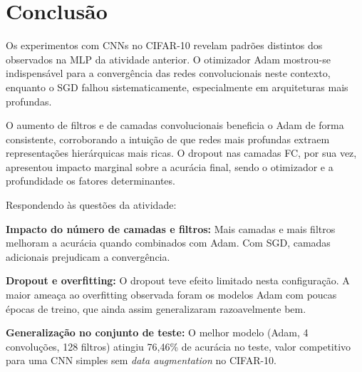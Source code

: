 \documentclass[12pt,a4paper]{article}
\begin{document}
\section{Conclusão}

Os experimentos com CNNs no CIFAR-10 revelam padrões distintos dos observados na MLP da atividade anterior. O otimizador Adam mostrou-se indispensável para a convergência das redes convolucionais neste contexto, enquanto o SGD falhou sistematicamente, especialmente em arquiteturas mais profundas.

O aumento de filtros e de camadas convolucionais beneficia o Adam de forma consistente, corroborando a intuição de que redes mais profundas extraem representações hierárquicas mais ricas. O dropout nas camadas FC, por sua vez, apresentou impacto marginal sobre a acurácia final, sendo o otimizador e a profundidade os fatores determinantes.

Respondendo às questões da atividade:

\textbf{Impacto do número de camadas e filtros:} Mais camadas e mais filtros melhoram a acurácia quando combinados com Adam. Com SGD, camadas adicionais prejudicam a convergência.

\textbf{Dropout e overfitting:} O dropout teve efeito limitado nesta configuração. A maior ameaça ao overfitting observada foram os modelos Adam com poucas épocas de treino, que ainda assim generalizaram razoavelmente bem.

\textbf{Generalização no conjunto de teste:} O melhor modelo (Adam, 4 convoluções, 128 filtros) atingiu 76,46\% de acurácia no teste, valor competitivo para uma CNN simples sem \textit{data augmentation} no CIFAR-10.
\end{document}
